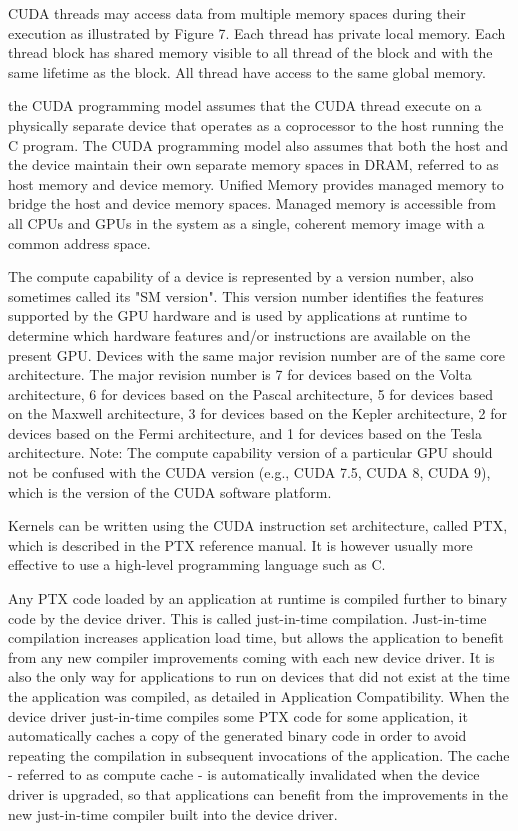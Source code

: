 CUDA threads may access data from multiple memory spaces during
their execution as illustrated by Figure 7. Each thread has
private local memory. Each thread block has shared memory visible
to all thread of the block and with the same lifetime as the
block. All thread have access to the same global
memory.~\cite[p.~2.3]{CUDA18}

the CUDA programming model assumes that the CUDA thread execute
on a physically separate device that operates as a coprocessor to the host
running the C program. The CUDA programming model also assumes that both the
host and the device maintain their own separate memory spaces in DRAM,
referred to as host memory and device memory. Unified Memory provides managed
memory to bridge the host and device memory spaces. Managed memory is
accessible from all CPUs and GPUs in the system as a single, coherent memory
image with a common address space.~\cite[p.~2.4]{CUDA18}

The compute capability of a device is represented by a version number, also
sometimes called its "SM version". This version number identifies the features
supported by the GPU hardware and is used by applications at runtime to
determine which hardware features and/or instructions are available on the
present GPU. Devices with the same major revision number are of the same core
architecture. The major revision number is 7 for devices based on the Volta
architecture, 6 for devices based on the Pascal architecture, 5 for devices
based on the Maxwell architecture, 3 for devices based on the Kepler
architecture, 2 for devices based on the Fermi architecture, and 1 for devices
based on the Tesla architecture. Note: The compute capability version of a
particular GPU should not be confused with the CUDA version (e.g., CUDA 7.5,
CUDA 8, CUDA 9), which is the version of the CUDA software
platform.~\cite[p.~2.4]{CUDA18}

Kernels can be written using the CUDA instruction set architecture, called PTX,
which is described in the PTX reference manual. It is however usually more
effective to use a high-level programming language such as
C.~\cite[p.~3.1]{CUDA18}

Any PTX code loaded by an application at runtime is compiled further to binary
code by the device driver. This is called just-in-time compilation.
Just-in-time compilation increases application load time, but allows the
application to benefit from any new compiler improvements coming with each new
device driver. It is also the only way for applications to run on devices that
did not exist at the time the application was compiled, as detailed in
Application Compatibility. When the device driver just-in-time compiles some
PTX code for some application, it automatically caches a copy of the generated
binary code in order to avoid repeating the compilation in subsequent
invocations of the application. The cache - referred to as compute cache - is
automatically invalidated when the device driver is upgraded, so that
applications can benefit from the improvements in the new just-in-time compiler
built into the device driver.~\cite[p.~3.1.1.2]{CUDA18}

